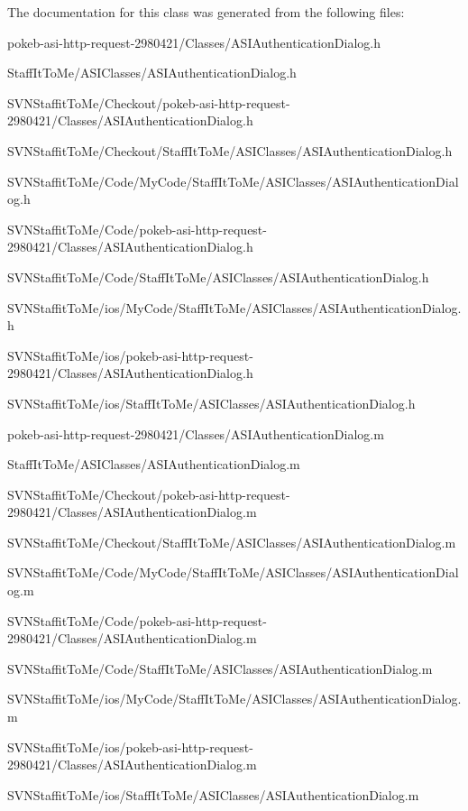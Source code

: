 \-The documentation for this class was generated from the following files\-:\begin{DoxyCompactItemize}
\item 
pokeb-\/asi-\/http-\/request-\/2980421/\-Classes/\-A\-S\-I\-Authentication\-Dialog.\-h\item 
\-Staff\-It\-To\-Me/\-A\-S\-I\-Classes/\-A\-S\-I\-Authentication\-Dialog.\-h\item 
\-S\-V\-N\-Staffit\-To\-Me/\-Checkout/pokeb-\/asi-\/http-\/request-\/2980421/\-Classes/\-A\-S\-I\-Authentication\-Dialog.\-h\item 
\-S\-V\-N\-Staffit\-To\-Me/\-Checkout/\-Staff\-It\-To\-Me/\-A\-S\-I\-Classes/\-A\-S\-I\-Authentication\-Dialog.\-h\item 
\-S\-V\-N\-Staffit\-To\-Me/\-Code/\-My\-Code/\-Staff\-It\-To\-Me/\-A\-S\-I\-Classes/\-A\-S\-I\-Authentication\-Dialog.\-h\item 
\-S\-V\-N\-Staffit\-To\-Me/\-Code/pokeb-\/asi-\/http-\/request-\/2980421/\-Classes/\-A\-S\-I\-Authentication\-Dialog.\-h\item 
\-S\-V\-N\-Staffit\-To\-Me/\-Code/\-Staff\-It\-To\-Me/\-A\-S\-I\-Classes/\-A\-S\-I\-Authentication\-Dialog.\-h\item 
\-S\-V\-N\-Staffit\-To\-Me/ios/\-My\-Code/\-Staff\-It\-To\-Me/\-A\-S\-I\-Classes/\-A\-S\-I\-Authentication\-Dialog.\-h\item 
\-S\-V\-N\-Staffit\-To\-Me/ios/pokeb-\/asi-\/http-\/request-\/2980421/\-Classes/\-A\-S\-I\-Authentication\-Dialog.\-h\item 
\-S\-V\-N\-Staffit\-To\-Me/ios/\-Staff\-It\-To\-Me/\-A\-S\-I\-Classes/\-A\-S\-I\-Authentication\-Dialog.\-h\item 
pokeb-\/asi-\/http-\/request-\/2980421/\-Classes/\-A\-S\-I\-Authentication\-Dialog.\-m\item 
\-Staff\-It\-To\-Me/\-A\-S\-I\-Classes/\-A\-S\-I\-Authentication\-Dialog.\-m\item 
\-S\-V\-N\-Staffit\-To\-Me/\-Checkout/pokeb-\/asi-\/http-\/request-\/2980421/\-Classes/\-A\-S\-I\-Authentication\-Dialog.\-m\item 
\-S\-V\-N\-Staffit\-To\-Me/\-Checkout/\-Staff\-It\-To\-Me/\-A\-S\-I\-Classes/\-A\-S\-I\-Authentication\-Dialog.\-m\item 
\-S\-V\-N\-Staffit\-To\-Me/\-Code/\-My\-Code/\-Staff\-It\-To\-Me/\-A\-S\-I\-Classes/\-A\-S\-I\-Authentication\-Dialog.\-m\item 
\-S\-V\-N\-Staffit\-To\-Me/\-Code/pokeb-\/asi-\/http-\/request-\/2980421/\-Classes/\-A\-S\-I\-Authentication\-Dialog.\-m\item 
\-S\-V\-N\-Staffit\-To\-Me/\-Code/\-Staff\-It\-To\-Me/\-A\-S\-I\-Classes/\-A\-S\-I\-Authentication\-Dialog.\-m\item 
\-S\-V\-N\-Staffit\-To\-Me/ios/\-My\-Code/\-Staff\-It\-To\-Me/\-A\-S\-I\-Classes/\-A\-S\-I\-Authentication\-Dialog.\-m\item 
\-S\-V\-N\-Staffit\-To\-Me/ios/pokeb-\/asi-\/http-\/request-\/2980421/\-Classes/\-A\-S\-I\-Authentication\-Dialog.\-m\item 
\-S\-V\-N\-Staffit\-To\-Me/ios/\-Staff\-It\-To\-Me/\-A\-S\-I\-Classes/\-A\-S\-I\-Authentication\-Dialog.\-m\end{DoxyCompactItemize}
